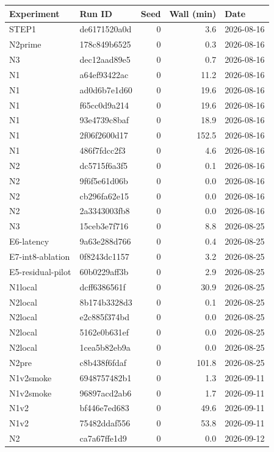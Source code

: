 \documentclass[10pt]{article}
\begin{document}
\begin{longtable}{@{}llrrl@{}}
\toprule
Experiment & Run ID & Seed & Wall (min) & Date \\
\midrule
\endhead
STEP1 & de6171520a0d & 0 & 3.6 & 2026-08-16 \\
N2prime & 178c849b6525 & 0 & 0.3 & 2026-08-16 \\
N3 & dec12aad89e5 & 0 & 0.7 & 2026-08-16 \\
N1 & a64ef93422ac & 0 & 11.2 & 2026-08-16 \\
N1 & ad0d6b7e1d60 & 0 & 19.6 & 2026-08-16 \\
N1 & f65cc0d9a214 & 0 & 19.6 & 2026-08-16 \\
N1 & 93e4739c8baf & 0 & 18.9 & 2026-08-16 \\
N1 & 2f06f2600d17 & 0 & 152.5 & 2026-08-16 \\
N1 & 486f7fdcc2f3 & 0 & 4.6 & 2026-08-16 \\
N2 & dc5715f6a3f5 & 0 & 0.1 & 2026-08-16 \\
N2 & 9f6f5e61d06b & 0 & 0.0 & 2026-08-16 \\
N2 & cb296fa62e15 & 0 & 0.0 & 2026-08-16 \\
N2 & 2a3343003fb8 & 0 & 0.0 & 2026-08-16 \\
N3 & 15ceb3e7f716 & 0 & 8.8 & 2026-08-25 \\
E6-latency & 9a63e288d766 & 0 & 0.4 & 2026-08-25 \\
E7-int8-ablation & 0f8243dc1157 & 0 & 3.2 & 2026-08-25 \\
E5-residual-pilot & 60b0229aff3b & 0 & 2.9 & 2026-08-25 \\
N1local & dcff6386561f & 0 & 30.9 & 2026-08-25 \\
N2local & 8b174b3328d3 & 0 & 0.1 & 2026-08-25 \\
N2local & e2c885f374bd & 0 & 0.0 & 2026-08-25 \\
N2local & 5162e0b631ef & 0 & 0.0 & 2026-08-25 \\
N2local & 1cea5b82eb9a & 0 & 0.0 & 2026-08-25 \\
N2pre & c8b438f6fdaf & 0 & 101.8 & 2026-08-25 \\
N1v2smoke & 6948757482b1 & 0 & 1.3 & 2026-09-11 \\
N1v2smoke & 96897acd2ab6 & 0 & 1.7 & 2026-09-11 \\
N1v2 & bf446e7ed683 & 0 & 49.6 & 2026-09-11 \\
N1v2 & 75482ddaf556 & 0 & 53.8 & 2026-09-11 \\
N2 & ca7a67ffe1d9 & 0 & 0.0 & 2026-09-12 \\

\end{longtable}
\end{document}
